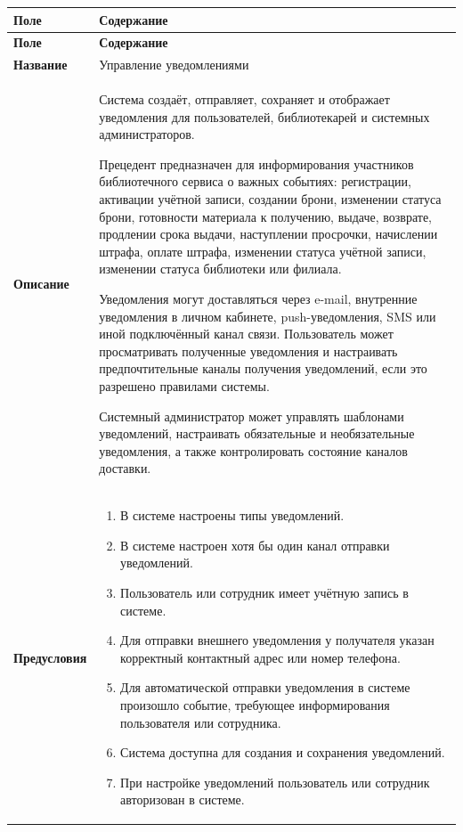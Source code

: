 \documentclass[12pt,a4paper]{article}
\begin{document}
		\begin{xltabular}{\textwidth}{
				|>{\raggedright\arraybackslash}p{2.7cm}
				|>{\raggedright\arraybackslash}X|
			}
			\hline
			\textbf{Поле} & \textbf{Содержание} \\
			\hline
			\endfirsthead
			
			\hline
			\textbf{Поле} & \textbf{Содержание} \\
			\hline
			\endhead
			
			\hline
			\endfoot
			
			\textbf{Название} &
			Управление уведомлениями \\
			\hline
			
			\textbf{Описание} &
			Система создаёт, отправляет, сохраняет и отображает уведомления для
			пользователей, библиотекарей и системных администраторов.
			
			Прецедент предназначен для информирования участников библиотечного
			сервиса о важных событиях: регистрации, активации учётной записи,
			создании брони, изменении статуса брони, готовности материала к
			получению, выдаче, возврате, продлении срока выдачи, наступлении
			просрочки, начислении штрафа, оплате штрафа, изменении статуса
			учётной записи, изменении статуса библиотеки или филиала.
			
			Уведомления могут доставляться через e-mail, внутренние уведомления
			в личном кабинете, push-уведомления, SMS или иной подключённый
			канал связи. Пользователь может просматривать полученные уведомления
			и настраивать предпочтительные каналы получения уведомлений, если
			это разрешено правилами системы.
			
			Системный администратор может управлять шаблонами уведомлений,
			настраивать обязательные и необязательные уведомления, а также
			контролировать состояние каналов доставки. \\
			\hline
			
			\textbf{Предусловия} &
			\begin{enumerate}
				\item В системе настроены типы уведомлений.
				\item В системе настроен хотя бы один канал отправки уведомлений.
				\item Пользователь или сотрудник имеет учётную запись в системе.
				\item Для отправки внешнего уведомления у получателя указан корректный
				контактный адрес или номер телефона.
				\item Для автоматической отправки уведомления в системе произошло
				событие, требующее информирования пользователя или сотрудника.
				\item Система доступна для создания и сохранения уведомлений.
				\item При настройке уведомлений пользователь или сотрудник авторизован
				в системе.
			\end{enumerate} \\
			\hline
			

\end{xltabular}
\end{document}
